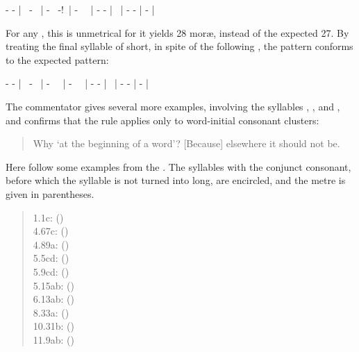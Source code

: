 - - | \shortsyllable\ - \shortsyllable\ | - \shortsyllable\ -!~| 
- \shortsyllable\ \shortsyllable\ | 
- - | \shortsyllable\ | -  - | - |

For any , this is unmetrical for it yields 28 mor\ae, instead
of the expected 27. By treating the final syllable of  short, 
in spite of the following , the pattern conforms 
to the expected pattern: 

- - | \shortsyllable\ - \shortsyllable\ | 
- \shortsyllable\ \shortsyllable\ | - \shortsyllable\ \shortsyllable\ | - - | 
\shortsyllable\ | - - | - |

The commentator gives several more examples, involving the syllables
, , and , and confirms that the rule
applies only to word-initial consonant clusters: 

\begin{quote}
{\footnotesize{}

Why `at the beginning of a word'? [Because] elsewhere it should not be.}
\end{quote}

\noindent
Here follow some examples from the \VSS. The syllables 
with the 
conjunct consonant, before which the syllable
is not turned into long, are encircled, and the metre is given in 
parentheses.

\begin{quote}	
1.1c:  ()\\
4.67c:  ()\\
4.89a:  ()\\
5.5cd:  ()\\
5.9cd:   ()\\
5.15ab:  ()\\
6.13ab:  ()\\
8.33a:  
 ()\\
10.31b:  ()\\
11.9ab:  ()
\end{quote}

